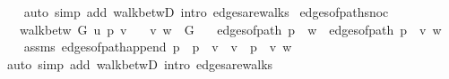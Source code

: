 \begin{isabellebody}
\ \ \isamarkupfalse%
\ {\isacharparenleft}{\kern0pt}auto\ simp\ add{\isacharcolon}{\kern0pt}\ walk{\isacharunderscore}{\kern0pt}betwD{\isacharparenleft}{\kern0pt}{}{\isacharparenright}{\kern0pt}\ intro{\isacharcolon}{\kern0pt}\ edges{\isacharunderscore}{\kern0pt}are{\isacharunderscore}{\kern0pt}walks{\isacharparenright}{\kern0pt}%
\endisatagproof
{\isafoldproof}%
%
\isadelimproof
\isanewline
%
\endisadelimproof
%
\isadeliminvisible
\isanewline
%
\endisadeliminvisible
%
\isataginvisible
{}\isamarkupfalse%
\ edges{\isacharunderscore}{\kern0pt}of{\isacharunderscore}{\kern0pt}path{\isacharunderscore}{\kern0pt}snoc{\isacharcolon}{\kern0pt}\isanewline
\ \ \ {\isachardoublequoteopen}walk{\isacharunderscore}{\kern0pt}betw\ G\ u\ p\ v{\isachardoublequoteclose}\isanewline
\ \ \ {\isachardoublequoteopen}{\isacharbraceleft}{\kern0pt}v{\isacharcomma}{\kern0pt}\ w{\isacharbraceright}{\kern0pt}\ {\isasymin}\ G{\isachardoublequoteclose}\isanewline
\ \ \ {\isachardoublequoteopen}edges{\isacharunderscore}{\kern0pt}of{\isacharunderscore}{\kern0pt}path\ {\isacharparenleft}{\kern0pt}p\ {\isacharat}{\kern0pt}\ {\isacharbrackleft}{\kern0pt}w{\isacharbrackright}{\kern0pt}{\isacharparenright}{\kern0pt}\ {\isacharequal}{\kern0pt}\ edges{\isacharunderscore}{\kern0pt}of{\isacharunderscore}{\kern0pt}path\ p\ {\isacharat}{\kern0pt}\ {\isacharbrackleft}{\kern0pt}{\isacharbraceleft}{\kern0pt}v{\isacharcomma}{\kern0pt}\ w{\isacharbraceright}{\kern0pt}{\isacharbrackright}{\kern0pt}{\isachardoublequoteclose}%
\endisataginvisible
{\isafoldinvisible}%
%
\isadeliminvisible
\isanewline
%
\endisadeliminvisible
%
\isadelimproof
\ \ %
\endisadelimproof
%
\isatagproof
{}\isamarkupfalse%
\ assms\ edges{\isacharunderscore}{\kern0pt}of{\isacharunderscore}{\kern0pt}path{\isacharunderscore}{\kern0pt}append{\isacharbrackleft}{\kern0pt}\ {\isacharquery}{\kern0pt}p\ {\isacharequal}{\kern0pt}\ p\ \ {\isacharquery}{\kern0pt}v\ {\isacharequal}{\kern0pt}\ v\ \ {\isacharquery}{\kern0pt}p{\isacharprime}{\kern0pt}\ {\isacharequal}{\kern0pt}\ {\isachardoublequoteopen}{\isacharbrackleft}{\kern0pt}v{\isacharcomma}{\kern0pt}\ w{\isacharbrackright}{\kern0pt}{\isachardoublequoteclose}{\isacharbrackright}{\kern0pt}\isanewline
\ \ \isamarkupfalse%
\ {\isacharparenleft}{\kern0pt}auto\ simp\ add{\isacharcolon}{\kern0pt}\ walk{\isacharunderscore}{\kern0pt}betwD{\isacharparenleft}{\kern0pt}{}{\isacharparenright}{\kern0pt}\ intro{\isacharcolon}{\kern0pt}\ edges{\isacharunderscore}{\kern0pt}are{\isacharunderscore}{\kern0pt}walks{\isacharparenright}{\kern0pt}%

\end{isabellebody}
